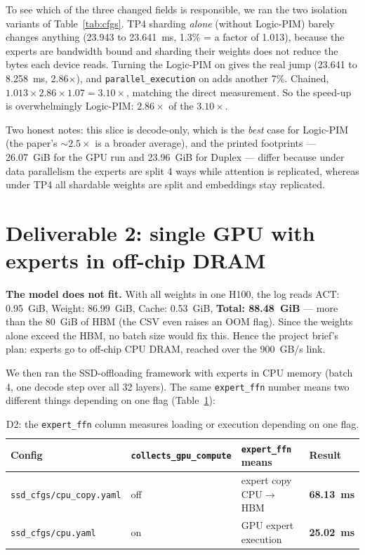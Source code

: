 \documentclass[11pt,a4paper]{report}
\begin{document}
To see which of the three changed fields is responsible, we ran the two isolation variants of Table~\ref{tab:cfgs}. TP4 sharding \textit{alone} (without Logic-PIM) barely changes anything (23.943 to 23.641~ms, 1.3\% = a factor of 1.013), because the experts are bandwidth bound and sharding their weights does not reduce the bytes each device reads. Turning the Logic-PIM on gives the real jump (23.641 to 8.258~ms, 2.86$\times$), and \texttt{parallel\_execution} on adds another 7\%. Chained, $1.013 \times 2.86 \times 1.07 = 3.10\times$, matching the direct measurement. So the speed-up is overwhelmingly Logic-PIM: $2.86\times$ of the $3.10\times$.

Two honest notes: this slice is decode-only, which is the \textit{best} case for Logic-PIM (the paper's $\sim 2.5\times$ is a broader average), and the printed footprints --- 26.07~GiB for the GPU run and 23.96~GiB for Duplex --- differ because under data parallelism the experts are split 4 ways while attention is replicated, whereas under TP4 all shardable weights are split and embeddings stay replicated.

\section{Deliverable 2: single GPU with experts in off-chip DRAM}

\textbf{The model does not fit.} With all weights in one H100, the log reads ACT: 0.95~GiB, Weight: 86.99~GiB, Cache: 0.53~GiB, \textbf{Total: 88.48~GiB} --- more than the 80~GiB of HBM (the CSV even raises an OOM flag). Since the weights alone exceed the HBM, no batch size would fix this. Hence the project brief's plan: experts go to off-chip CPU DRAM, reached over the 900~GB/s link.

We then ran the SSD-offloading framework with experts in CPU memory (batch 4, one decode step over all 32 layers). The same \texttt{expert\_ffn} number means two different things depending on one flag (Table~\ref{tab:d2}):

\begin{table}[htbp]
\centering
\small
\caption{D2: the \texttt{expert\_ffn} column measures loading or execution depending on one flag.}
\label{tab:d2}
\begin{tabular}{llll}
\toprule
Config & \texttt{collects\_gpu\_compute} & \texttt{expert\_ffn} means & Result \\
\midrule
\texttt{ssd\_cfgs/cpu\_copy.yaml} & off & expert copy CPU$\rightarrow$HBM & \textbf{68.13~ms} \\
\texttt{ssd\_cfgs/cpu.yaml} & on & GPU expert execution & \textbf{25.02~ms} \\
\bottomrule
\end{tabular}
\end{table}
\end{document}
